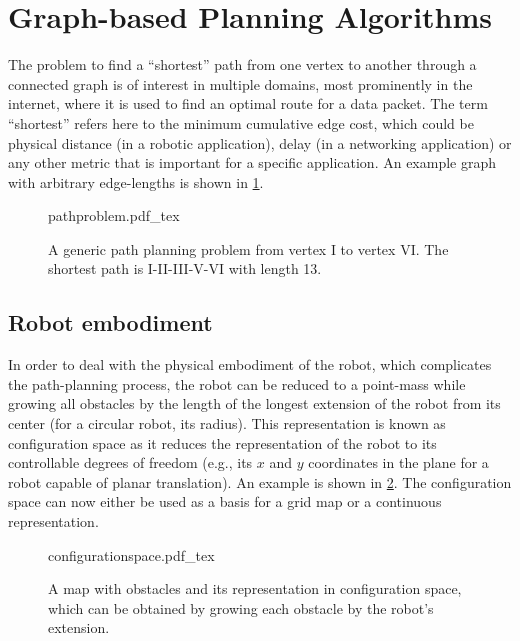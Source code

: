 \section{Graph-based Planning Algorithms}

The problem to find a ``shortest'' path from one vertex to another through a connected graph is of interest in multiple domains, most prominently in the internet, where it is used to find an optimal route for a data packet. The term ``shortest'' refers here to the minimum cumulative edge cost, which could be physical distance (in a robotic application), delay (in a networking application) or any other metric that is important for a specific application. An example graph with arbitrary edge-lengths is shown in \cref{fig:pathproblem}.

\begin{figure}[!htb]
    \centering
    \def\svgwidth{0.6\textwidth}
    {pathproblem.pdf_tex}
    \caption{A generic path planning problem from vertex I to vertex VI. The shortest path is I-II-III-V-VI with length 13. \label{fig:pathproblem}}
\end{figure}

\subsection{Robot embodiment}
In order to deal with the physical embodiment of the robot, which complicates the path-planning process, the robot can be reduced to a point-mass while growing all obstacles by the length of the longest extension of the robot from its center (for a circular robot, its radius). This representation is known as configuration space as it reduces the representation of the robot to its controllable degrees of freedom (e.g., its $x$ and $y$ coordinates in the plane for a robot capable of planar translation). An example is shown in \cref{fig:cspace}. The configuration space can now either be used as a basis for a grid map or a continuous representation.

\begin{figure}[!htb]
    \centering
    \def\svgwidth{0.9\textwidth}
    {configurationspace.pdf_tex}
    \caption{A map with obstacles and its representation in configuration space, which can be obtained by growing each obstacle by the robot's extension. \label{fig:cspace}}
\end{figure}

